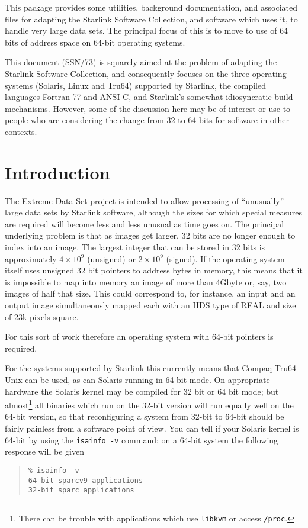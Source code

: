 \documentclass[twoside,11pt]{article}
\newcommand{\stardocinitials}  {SSN}
\newcommand{\stardocnumber}    {73.2 (draft)}
\newcommand{\stardocabstract}  {
This package provides some utilities, background documentation,
and associated files
for adapting the Starlink Software Collection, and software which uses it,
to handle very large data sets.
The principal focus of this is to move to use of 64 bits of address
space on 64-bit operating systems.

This document (SSN/73) is squarely aimed at the problem of adapting the
Starlink Software Collection, and consequently focuses on
the three operating systems (Solaris, Linux and Tru64) supported by Starlink,
the compiled languages Fortran 77 and ANSI C,
and Starlink's somewhat idiosyncratic build mechanisms.
However, some of the discussion here may be of interest or use to
people who are considering the change from 32 to 64 bits for
software in other contexts.
}
\newcommand{\stardocname}{\stardocinitials /\stardocnumber}
\newenvironment{latexonly}{}{}
\renewcommand{\_}{\texttt{\symbol{95}}}
\newcommand{\file}[1]{{\tt #1}}
\newenvironment{squote}{\begin{quote}\begin{small}}{\end{small}\end{quote}}
\renewcommand{\thepage}{\roman{page}}
\begin{document}
\stardocabstract
  \newpage
  \begin{latexonly}
    \setlength{\parskip}{0mm}
    \tableofcontents
    \setlength{\parskip}{\medskipamount}
    \markboth{\stardocname}{\stardocname}
  \end{latexonly}
\cleardoublepage
\renewcommand{\thepage}{\arabic{page}}
\setcounter{page}{1}




\section{Introduction}

The Extreme Data Set project is intended to allow processing of ``unusually''
large data sets by Starlink software,
although the sizes for which special measures
are required will become less and less unusual as time goes on.
The principal underlying problem is that as images get larger,
32 bits are no longer enough to index into an image.
The largest integer that can be stored in 32 bits
is approximately $4 \times 10^9$ (unsigned) or $2 \times 10^9$ (signed).
If the operating system itself uses unsigned 32 bit pointers to
address bytes
in memory, this means that it is impossible to map into memory
an image of more
than 4Gbyte or, say, two images of half that size.
This could correspond to, for instance, an input and an output image
simultaneously mapped each with an HDS type of \_REAL and
size of 23k pixels square.

For this sort of work therefore an operating system with 64-bit
pointers is required.

For the systems supported by
Starlink this currently means that Compaq Tru64 Unix can be used,
as can Solaris running in 64-bit mode.
On appropriate hardware the Solaris kernel
may be compiled for 32 bit or 64 bit mode;
but almost\footnote{
   There can be trouble with applications which use
   \file{libkvm} or access \file{/proc}.}
all binaries which run on the 32-bit version
will run equally well on the 64-bit version,
so that reconfiguring a system from 32-bit to 64-bit should be
fairly painless from a software point of view.
You can tell if your Solaris kernel is 64-bit
by using the \file{isainfo -v} command; on a 64-bit system the
following response will be given
\begin{squote}
\begin{verbatim}
% isainfo -v
64-bit sparcv9 applications
32-bit sparc applications
\end{verbatim}
\end{squote}
\end{document}

